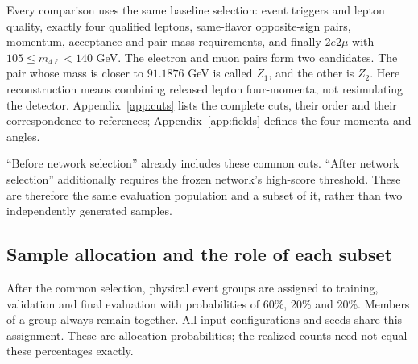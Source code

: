 \documentclass[11pt,a4paper]{article}
\begin{document}
Every comparison uses the same baseline selection: event triggers and lepton quality, exactly four qualified leptons, same-flavor opposite-sign pairs, momentum, acceptance and pair-mass requirements, and finally $2e2\mu$ with $105\leq m_{4\ell}<140$ GeV.
The electron and muon pairs form two candidates. The pair whose mass is closer to $91.1876$ GeV is called $Z_1$, and the other is $Z_2$.
Here reconstruction means combining released lepton four-momenta, not resimulating the detector.
Appendix~\ref{app:cuts} lists the complete cuts, their order and their correspondence to references; Appendix~\ref{app:fields} defines the four-momenta and angles.

``Before network selection'' already includes these common cuts. ``After network selection'' additionally requires the frozen network's high-score threshold.
These are therefore the same evaluation population and a subset of it, rather than two independently generated samples.

\subsection{Sample allocation and the role of each subset}
After the common selection, physical event groups are assigned to training, validation and final evaluation with probabilities of 60\%, 20\% and 20\%.
Members of a group always remain together. All input configurations and seeds share this assignment.
These are allocation probabilities; the realized counts need not equal these percentages exactly.
\end{document}
